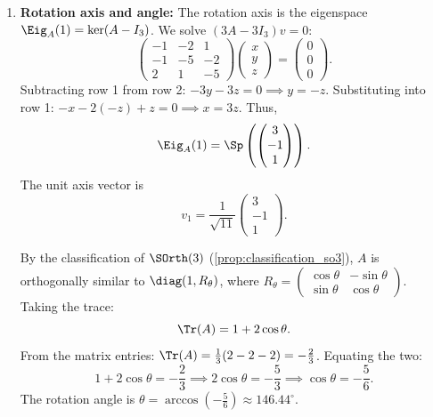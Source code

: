 \begin{exercisesolution}
\begin{enumerate}[label=\textbf{(\alph*)}]
    \item \textbf{Rotation axis and angle:}
    The rotation axis is the eigenspace $\Eig_A(1) = \ker(A - I_3)$.
    We solve $(3A - 3I_3)v = 0$:
    \[
    \begin{pmatrix} -1 & -2 & 1 \\ -1 & -5 & -2 \\ 2 & 1 & -5 \end{pmatrix} \begin{pmatrix} x \\ y \\ z \end{pmatrix} = \begin{pmatrix} 0 \\ 0 \\ 0 \end{pmatrix}.
    \]
    Subtracting row 1 from row 2: $-3y - 3z = 0 \implies y = -z$.
    Substituting into row 1: $-x - 2(-z) + z = 0 \implies x = 3z$.
    Thus,
    \[
    \Eig_A(1) = \Sp\left( \begin{pmatrix} 3 \\ -1 \\ 1 \end{pmatrix} \right).
    \]
    The unit axis vector is
    \[
    v_1 = \frac{1}{\sqrt{11}} \begin{pmatrix} 3 \\ -1 \\ 1 \end{pmatrix}.
    \]

    By the classification of $\SOrth(3)$ (\cref{prop:classification_so3}), $A$ is orthogonally similar to $\diag(1, R_\theta)$, where $R_\theta = \left(\begin{smallmatrix} \cos\theta & -\sin\theta \\ \sin\theta & \cos\theta \end{smallmatrix}\right)$.
    Taking the trace:
    \[
    \Tr(A) = 1 + 2\cos\theta.
    \]
    From the matrix entries: $\Tr(A) = \frac{1}{3}(2 - 2 - 2) = -\frac{2}{3}$.
    Equating the two:
    \[
    1 + 2\cos\theta = -\frac{2}{3} \implies 2\cos\theta = -\frac{5}{3} \implies \cos\theta = -\frac{5}{6}.
    \]
    The rotation angle is $\theta = \arccos\left(-\frac{5}{6}\right) \approx 146.44^\circ$. \qedhere
\end{enumerate}
\end{exercisesolution}

